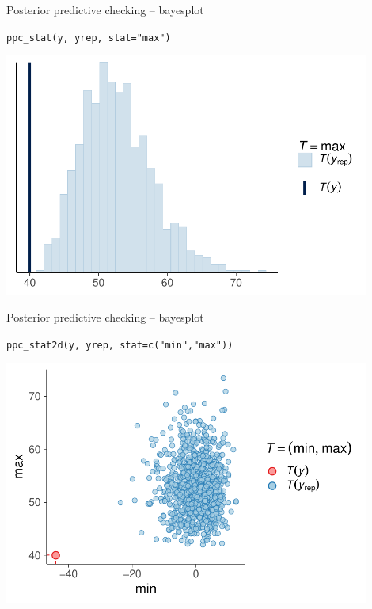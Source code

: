 \documentclass[t]{beamer}
\begin{document}
\begin{frame}{Posterior predictive checking -- bayesplot}

  \vspace{-1\baselineskip}
  \texttt{ppc\_stat(y, yrep, stat="max")}
  
  \includegraphics[height=8cm]{Newcomb_ppc_stat_max.pdf}

\end{frame}

\begin{frame}{Posterior predictive checking -- bayesplot}

  \vspace{-1\baselineskip}
  \texttt{ppc\_stat2d(y, yrep, stat=c("min","max"))}
  
  \includegraphics[height=8cm]{Newcomb_ppc_stat2d_minmax.pdf}

\end{frame}
\end{document}
